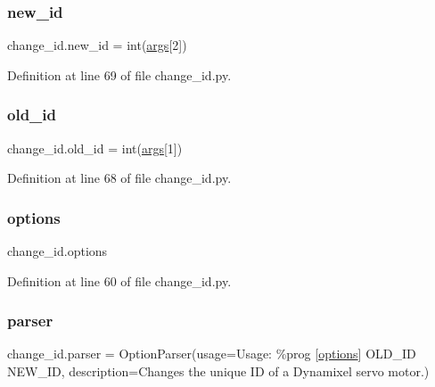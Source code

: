 \subsubsection{\texorpdfstring{new\+\_\+id}{new\_id}}
{\footnotesize\ttfamily change\+\_\+id.\+new\+\_\+id = int(\hyperlink{namespacechange__id_a5bdd55ad16e9dd8f0c26ae691f0ad139}{args}\mbox{[}2\mbox{]})}



Definition at line 69 of file change\+\_\+id.\+py.

\mbox{\label{namespacechange__id_a85afcf9b9ace0f857f9a76182a05ca04}} 
\subsubsection{\texorpdfstring{old\+\_\+id}{old\_id}}
{\footnotesize\ttfamily change\+\_\+id.\+old\+\_\+id = int(\hyperlink{namespacechange__id_a5bdd55ad16e9dd8f0c26ae691f0ad139}{args}\mbox{[}1\mbox{]})}



Definition at line 68 of file change\+\_\+id.\+py.

\mbox{\label{namespacechange__id_a7f46fc810d5fc15c77d44defe6d6984a}} 
\subsubsection{\texorpdfstring{options}{options}}
{\footnotesize\ttfamily change\+\_\+id.\+options}



Definition at line 60 of file change\+\_\+id.\+py.

\mbox{\label{namespacechange__id_a5d63c405e073798967144fffba4badb1}} 
\subsubsection{\texorpdfstring{parser}{parser}}
{\footnotesize\ttfamily change\+\_\+id.\+parser = Option\+Parser(usage=\textquotesingle{}Usage\+: \%prog \mbox{[}\hyperlink{namespacechange__id_a7f46fc810d5fc15c77d44defe6d6984a}{options}\mbox{]} O\+L\+D\+\_\+\+ID N\+E\+W\+\_\+\+ID\textquotesingle{}, description=\textquotesingle{}Changes the unique ID of a Dynamixel servo motor.\textquotesingle{})}



